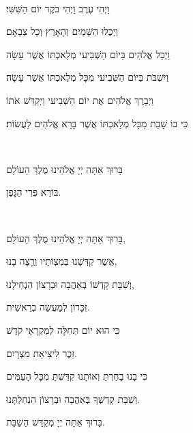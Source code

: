 \documentclass[letterpaper,10pt]{article}
\newenvironment{HgHebrew}{\begin{hebrew}\strut\\\noindent\LARGE}{\end{hebrew}}
\begin{document}
\begin{minipage}[t]{.5\linewidth}
\vspace{-5mm}
\begin{HgHebrew} 
\strut וַיְהִי עֶרֶב וַיְהִי בֹקֶר יוֹם הַשִּׁשִּׁי׃ \\
\strut וַיְכֻלּוּ הַשָּׁמַיִם וְהָאָרֶץ וְכָל צְבָאָם׃ \\
\strut וַיְכַל אֱלֹהִים בַּיוֹם הַשְּׁבִיעי מְלַאכְתּוֹ אֲשֶׁר עָשָׂה \\
\strut וַיִשְׁבֹּת בַּיּוֹם הַשְּׁבִיעי מִכָּל מְלַאכְתּוֹ אֲשֶׁר עָשָׂה׃ \\
\strut וַיְבָרֶךְ אֱלֹהִים אֶת יוֹם הַשְּׁבִיעי וַיְקַדֵּשׁ אֹתוֹ \\
\strut כִּי בוֹ שָׁבַת מִכָּל מְלַאכְתּוֹ אֲשֶׁר בָּרָא אֱלֹהִים לַעֲשׂוֹת׃ \\
\strut \\
\strut בָּרוּךְ אַתָּה יְיָ אֱלֹהֵינוּ מֶלֶךְ הָעוֹלָם \\
\strut בּוֹרֵא פְּרִי הַגָּפֶן.  \\
\strut \\
\strut בָּרוּךְ אַתָּה יְיָ אֱלֹהֵינוּ מֶלֶךְ הָעוֹלָם, \\
\strut אֲשֶׁר קִדְּשָׁנוּ בְּמִצְוֹתָיו וְרַָצָה בָנוּ, \\
\strut וְשַׁבָּת קָדְשׁוֹ בְּאַהֲבָה וּבְרָצוֹן הִנְחִילָנוּ, \\
\strut זִכָּרוֹן לְמַעֲשֵׂה בְרֵאשִׁית.  \\
\strut כִּי הוּא יוֹם תְּחִלָּה לְמִקְרָאֵי קֹדֶשׁ \\
\strut זֵכֶר לִיצִיאַת מִצְרָיִם.  \\
\strut כִּי בָנוּ בָחַרְתָּ וְאוֹתָנוּ קִדַּשְׁתָּ מִכָּל הָעַמִּים \\
\strut וְשַׁבָּת קָדְשְׁךָ בְּאַהֲבָה וּבְרָצוֹן הִנְחַלְתָּנוּ.  \\
\strut בָּרוּךְ אַתָּה יְיָ מְקַדֵּשׁ הַשַׁבָּת.  \\
\end{HgHebrew}
\end{minipage}
\end{document}
